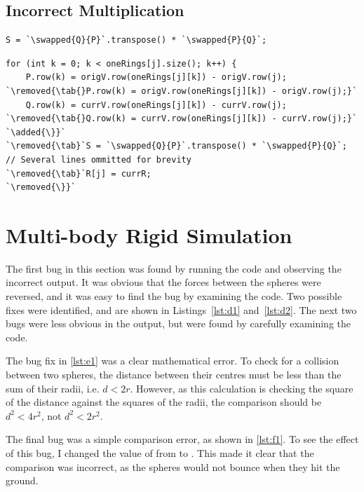 \documentclass[12pt, a4paper]{article}
\newcommand{\highlight}[2]{\colorbox{#1}{\vphantom{Ay}#2}}
\newcommand{\removed}[1]{\highlight{pink}{#1}}
\newcommand{\added}[1]{\highlight{lime}{#1}}
\newcommand{\swapped}[2]{\removed{#1}\added{#2}}
\newcommand{\inline}[1]{\fbox{\texttt{#1}}}
\newcommand{\tab}[0]{\space\space\space\space}
\begin{document}
    \subsection{Incorrect Multiplication}
        \begin{lstlisting}[caption={\inline{P} and \inline{Q} have been swapped.}, label={lst:c1}]
S = `\swapped{Q}{P}`.transpose() * `\swapped{P}{Q}`;
\end{lstlisting}

        \begin{lstlisting}[caption={Two redundant lines have been removed, and the \inline{for} loop has 
            been closed much earlier. The bug fix shown in \autoref{lst:c1} has also been applied.}, 
            label={lst:c2}]
for (int k = 0; k < oneRings[j].size(); k++) {
    P.row(k) = origV.row(oneRings[j][k]) - origV.row(j);
`\removed{\tab{}P.row(k) = origV.row(oneRings[j][k]) - origV.row(j);}`
    Q.row(k) = currV.row(oneRings[j][k]) - currV.row(j);
`\removed{\tab{}Q.row(k) = currV.row(oneRings[j][k]) - currV.row(j);}`
`\added{\}}`
`\removed{\tab}`S = `\swapped{Q}{P}`.transpose() * `\swapped{P}{Q}`;
// Several lines ommitted for brevity
`\removed{\tab}`R[j] = currR;
`\removed{\}}`
\end{lstlisting}

\section{Multi-body Rigid Simulation}
    The first bug in this section was found by running the code and observing the
        incorrect output.
    It was obvious that the forces between the spheres were reversed, and it was
        easy to find the bug by examining the code.
    Two possible fixes were identified, and are shown in Listings~\ref{lst:d1}
        and~\ref{lst:d2}.
    The next two bugs were less obvious in the output, but were found by carefully
        examining the code.

    The bug fix in \autoref{lst:e1} was a clear mathematical error.
    To check for a collision between two spheres, the distance between their
        centres must be less than the sum of their radii, i.e. $d<2r$.
    However, as this calculation is checking the square of the distance against the
        squares of the radii, the comparison should be $d^2<4r^2$, not $d^2<2r^2$.

    The final bug was a simple comparison error, as shown in \autoref{lst:f1}.
    To see the effect of this bug, I changed the value of \inline{CRCoeff} from
        \inline{0.0} to \inline{1.0}.
    This made it clear that the comparison was incorrect, as the spheres would not
        bounce when they hit the ground.
\end{document}

